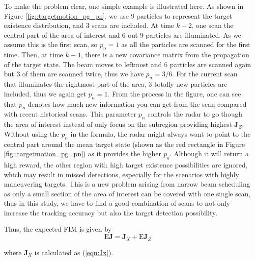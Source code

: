 \documentclass[12pt,journal,draftclsnofoot,onecolumn]{IEEEtran}
\begin{document}
To make the problem clear, one simple example is illustrated here. As shown in Figure \ref{fig::targetmotion_pg_pn}, we use 9 particles to represent the target existence distribution, and 3 scans are included. At time $k-2$, one scan the central part of the area of interest and 6 out 9 particles are illuminated. As we assume this is the first scan, so $p_n=1$ as all the particles are scanned for the first time. Then, at time $k-1$, there is a new covariance matrix from the propagation of the target state. The beam moves to leftmost and 6 particles are scanned again but 3 of them are scanned twice, thus we have $p_n = 3/6$. For the current scan that illuminates the rightmost part of the area, 3 totally new particles are included, thus we again get $p_n=1$. From the process in the figure, one can see that $p_n$ denotes how much new information you can get from the scan compared with recent historical scans. This parameter $p_n$ controls the radar to go though the area of interest instead of only focus on the subregion providing highest $\mathbf{J}_Z$. Without using the $p_n$ in the formula, the radar might always want to point to the central part around the mean target state (shown as the red rectangle in Figure \ref{fig::targetmotion_pg_pn}) as it provides the higher $p_g$. Although it will return a high reward, the other region with high target existence possibilities are ignored, which may result in missed detections, especially for the scenarios with highly maneuvering targets. This is a new problem arising from narrow beam scheduling as only a small section of the area of interest can be covered with one single scan, thus in this study, we have to find a good combination of scans to not only increase the tracking accuracy but also the target detection possibility.


Thus, the expected {FIM} is given by 
\begin{equation}
	\text{E}\mathbf{J} = \mathbf{J}_X + \text{E}\mathbf{J}_Z
\end{equation}

where $\mathbf{J}_X$ is calculated as (\ref{eqn:Jx}).
\end{document}
